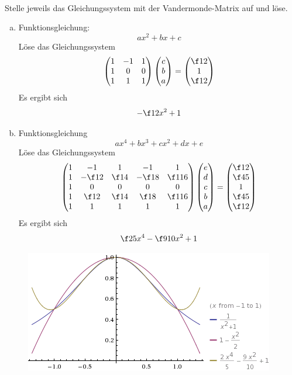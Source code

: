 \documentclass{scrartcl}
\begin{document}
	\begin{aufgabe}~

		Stelle jeweils das Gleichungssystem mit der Vandermonde-Matrix auf und löse.
		\begin{enumerate}[a)]
			\item
				Funktionsgleichung:
				\[
					ax^2 + bx + c
				\]
				Löse das Gleichungssystem
				\[
					\begin{pmatrix}1&-1&1\\1&0&0\\1&1&1\end{pmatrix}\begin{pmatrix}c\\b\\a\end{pmatrix}= \begin{pmatrix}\f12\\1\\\f12\end{pmatrix}
				\]
				Es ergibt sich
				\[
					-\f12x^2 + 1
				\]
			\item
				Funktionsgleichung
				\[
					ax^4+bx^3+cx^2+dx+e
				\]
				Löse das Gleichungssystem
				\[
					\begin{pmatrix}1&-1&1&-1&1\\1&-\f12&\f14&-\f18&\f1{16}\\1&0&0&0&0\\1&\f12&\f14&\f18&\f1{16}\\1&1&1&1&1\end{pmatrix}\begin{pmatrix}e\\d\\c\\b\\a\end{pmatrix}= \begin{pmatrix}\f 12\\\f45\\1\\\f45\\\f12\end{pmatrix}
				\]
				Es ergibt sich
				\[
					\f25 x^4 - \f 9{10}x^2 + 1
				\]
		\end{enumerate}  		
		\begin{figure}[htb]
				\centering
				\includegraphics[scale=0.7]{nla_6_1.png}
			\end{figure} 
 	\end{aufgabe}
	
\end{document}
